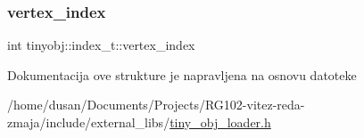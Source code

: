 \mbox{\label{structtinyobj_1_1index__t_a7eeb7de9f1fad091081b2b1d037c4beb}} 
\subsubsection{\texorpdfstring{vertex\+\_\+index}{vertex\_index}}
{\footnotesize\ttfamily int tinyobj\+::index\+\_\+t\+::vertex\+\_\+index}



Dokumentacija ove strukture je napravljena na osnovu datoteke \begin{DoxyCompactItemize}
\item 
/home/dusan/\+Documents/\+Projects/\+R\+G102-\/vitez-\/reda-\/zmaja/include/external\+\_\+libs/\hyperlink{tiny__obj__loader_8h}{tiny\+\_\+obj\+\_\+loader.\+h}\end{DoxyCompactItemize}
